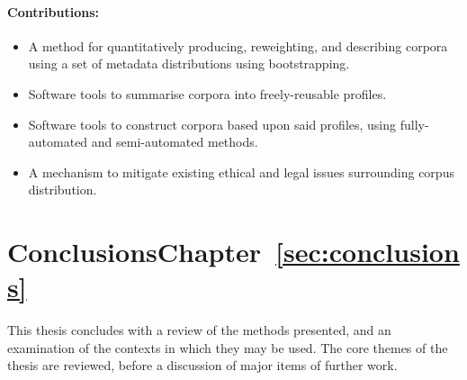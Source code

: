 \paragraph{Contributions:}
\begin{itemize}
    \item A method for quantitatively producing, reweighting, and describing corpora using a set of metadata distributions using bootstrapping.
    \item Software tools to summarise corpora into freely-reusable profiles.
    \item Software tools to construct corpora based upon said profiles, using fully-automated and semi-automated methods.
    \item A mechanism to mitigate existing ethical and legal issues surrounding corpus distribution.
\end{itemize}


\section*{Conclusions\hfill{}Chapter~\ref{sec:conclusions}}
This thesis concludes with a review of the methods presented, and an examination of the contexts in which they may be used.  The core themes of the thesis are reviewed, before a discussion of major items of further work.


